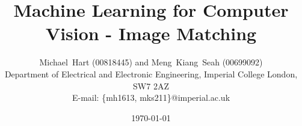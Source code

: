\documentclass[a4paper, 10pt, conference]{ieeeconf}
\begin{document}
\title{Machine Learning for Computer Vision - Image Matching}
\author{Michael~Hart (00818445) and
        Meng~Kiang~Seah (00699092)
\\
        Department of Electrical and Electronic Engineering,
        Imperial College London,
        SW7 2AZ
\\
        E-mail: \{mh1613, mks211\}@imperial.ac.uk}
\date{\today}




\maketitle


%


\end{document}
